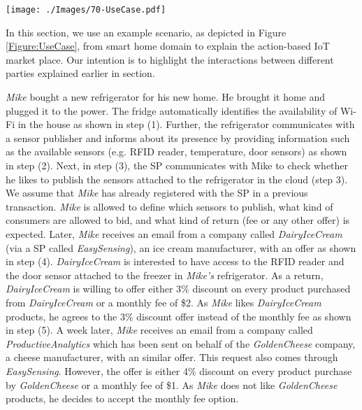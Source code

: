 \documentclass[conference]{IEEEtran}
\begin{document}
\begin{figure*}[t]
 \centering
\texttt{[image: ./Images/70-UseCase.pdf]}
\caption{A futuristic scenario that explains the interactions in sensing as a service model in trading-based environment. This is not a typical smart home scenario where refrigerator tells the users what is inside, what need to be shopped or what kind of recipes can be prepared for dinner.}
 \label{Figure:UseCase}	
\vspace{-0.60cm}	
\end{figure*}


In this section, we use an example scenario, as depicted in Figure \ref{Figure:UseCase}, from smart home domain to explain the action-based IoT market place. Our intention is to highlight the interactions between different parties explained earlier in section.


 
\textit{Mike} bought a new refrigerator for his new home. He brought it home and plugged it to the power. The fridge automatically identifies the availability of Wi-Fi in the house as shown in step (1). Further, the refrigerator communicates with a sensor publisher and informs about its presence by providing information such as the available sensors (e.g. RFID reader, temperature, door sensors) as shown in  step (2). 
Next, in step (3), the SP communicates with Mike to check whether he likes to publish the sensors attached to the refrigerator in the cloud (step 3). We assume that \textit{Mike} has already registered with the SP in a previous transaction. \textit{Mike} is allowed to define which sensors to publish, what kind of consumers are allowed to bid, and what kind of return (fee or any other offer) is expected. Later, \textit{Mike} receives an email from a company called \textit{DairyIceCream} (via a SP called \textit{EasySensing}), an ice cream manufacturer, with an offer as shown in  step (4). \textit{DairyIceCream} is interested to have access to the RFID reader and the door sensor attached to the freezer in  \textit{Mike's} refrigerator. As a return, \textit{DairyIceCream} is willing to offer either 3\% discount on every product purchased from \textit{DairyIceCream} or a monthly fee of \$2. As \textit{Mike} likes \textit{DairyIceCream} products, he agrees to the 3\% discount offer instead of the monthly fee as shown in  step (5). A week later, \textit{Mike} receives an email from a company called \textit{ProductiveAnalytics} which has been sent on behalf of the \textit{GoldenCheese} company, a cheese manufacturer, with an similar offer. This request  also comes through \textit{EasySensing}. However, the offer is either 4\% discount on every product purchase by \textit{GoldenCheese} or a monthly fee of \$1. As \textit{Mike} does not like \textit{GoldenCheese} products, he decides to accept the monthly fee option. 
\end{document}
